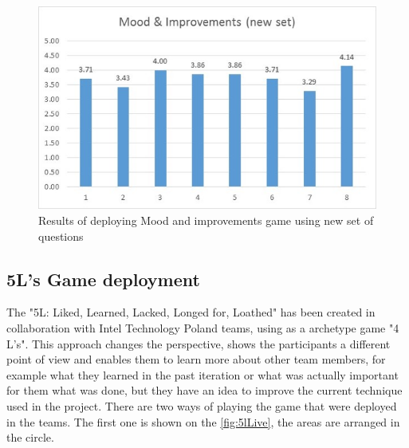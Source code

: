 \begin{figure}[!htbp]
\caption{Results of deploying Mood and improvements game using new set of questions}
\label{fig:moodResultsNew}
\centering
\includegraphics[width=1\textwidth]{charts/moodNewSet}
\end{figure}

\subsection{5L's Game deployment}
The "5L: Liked, Learned, Lacked, Longed for, Loathed" has been created in collaboration with Intel Technology Poland teams, using as a archetype game "4 L's". This approach changes the perspective, shows the participants a different point of view and enables them to learn more about other team members, for example what they learned in the past iteration or what was actually important for them what was done, but they have an idea to improve the current technique used in the project. There are two ways of playing the game that were deployed in the teams. The first one is shown on the \autoref{fig:5lLive}, the areas are arranged in the circle.

